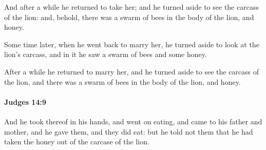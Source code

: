 			\begin{versebox}
					\item[BHS] 
					\item[ASV] And after a while he returned to take her; and he turned aside to see the carcass of the lion: and, behold, there was a swarm of bees in the body of the lion, and honey.
					\item[NIV] Some time later, when he went back to marry her, he turned aside to look at the lion’s carcass, and in it he saw a swarm of bees and some honey.
					\item[NRSV] After a while he returned to marry her, and he turned aside to see the carcass of the lion, and there was a swarm of bees in the body of the lion, and honey.
			\end{versebox}

		\paragraph{Judges 14:9} %
			\label{JUDGES-14-9}

			And he took thereof in his hands, and went on eating, and came to his father and mother, and he gave them, and they did eat: but he told not them that he had taken the honey out of the carcase of the lion.

